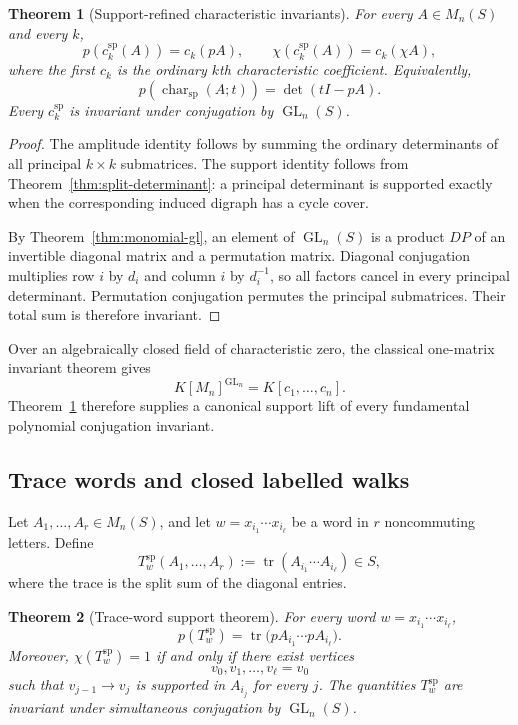 \documentclass[11pt]{amsart}
\numberwithin{equation}{section}
\newtheorem{theorem}{Theorem}[section]
\theoremstyle{definition}
\newcommand{\GL}{\operatorname{GL}}
\newcommand{\tr}{\operatorname{tr}}
\newcommand{\charsp}{\operatorname{char}_{\mathrm{sp}}}
\begin{document}
\begin{theorem}[Support-refined characteristic invariants]
\label{thm:split-characteristic}
For every $A\in M_n(S)$ and every $k$,
\[
p(c_k^{\mathrm{sp}}(A))=c_k(pA),
\qquad
\chi(c_k^{\mathrm{sp}}(A))=c_k(\chi A),
\]
where the first $c_k$ is the ordinary $k$th characteristic coefficient.
Equivalently,
\[
p(\charsp(A;t))=\det(tI-pA).
\]
Every $c_k^{\mathrm{sp}}$ is invariant under conjugation by
$\GL_n(S)$.
\end{theorem}

\begin{proof}
The amplitude identity follows by summing the ordinary determinants of all
principal $k\times k$ submatrices.  The support identity follows from
Theorem~\ref{thm:split-determinant}: a principal determinant is supported
exactly when the corresponding induced digraph has a cycle cover.

By Theorem~\ref{thm:monomial-gl}, an element of $\GL_n(S)$ is a product
$DP$ of an invertible diagonal matrix and a permutation matrix.  Diagonal
conjugation multiplies row $i$ by $d_i$ and column $i$ by $d_i^{-1}$, so
all factors cancel in every principal determinant.  Permutation conjugation
permutes the principal submatrices.  Their total sum is therefore invariant.
\end{proof}

Over an algebraically closed field of characteristic zero, the classical
one-matrix invariant theorem gives
\[
K[M_n]^{\GL_n}=K[c_1,\dots,c_n].
\]
Theorem~\ref{thm:split-characteristic} therefore supplies a canonical
support lift of every fundamental polynomial conjugation invariant.

\subsection{Trace words and closed labelled walks}

Let $A_1,\dots,A_r\in M_n(S)$, and let
$w=x_{i_1}\cdots x_{i_\ell}$ be a word in $r$ noncommuting letters.  Define
\[
T_w^{\mathrm{sp}}(A_1,\dots,A_r)
:=\tr(A_{i_1}\cdots A_{i_\ell})\in S,
\]
where the trace is the split sum of the diagonal entries.

\begin{theorem}[Trace-word support theorem]
\label{thm:split-trace-word}
For every word $w=x_{i_1}\cdots x_{i_\ell}$,
\[
p(T_w^{\mathrm{sp}})=
\tr\bigl(pA_{i_1}\cdots pA_{i_\ell}\bigr).
\]
Moreover, $\chi(T_w^{\mathrm{sp}})=1$ if and only if there exist vertices
\[
v_0,v_1,\dots,v_\ell=v_0
\]
such that $v_{j-1}\to v_j$ is supported in $A_{i_j}$ for every $j$.
The quantities $T_w^{\mathrm{sp}}$ are invariant under simultaneous
conjugation by $\GL_n(S)$.
\end{theorem}
\end{document}
